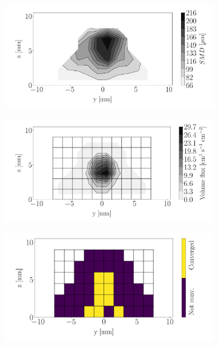 

\begin{figure}[h!]
\centering
\begin{subfigure}[b]{0.3\textwidth}
	\centering
   \includegraphics[scale=\scaleSLIJICF]{./part2_developments/figures_ch5_resolved_JICF/injectors_SLI/uG100_dx20_x10_SMD_map}
\end{subfigure}
   \hspace{0.17in}
\begin{subfigure}[b]{0.3\textwidth}
	\centering
   \includegraphics[scale=\scaleSLIJICF]{./part2_developments/figures_ch5_resolved_JICF/injectors_SLI/uG100_dx20_x10_volume_flux_map}
\end{subfigure}
   \hspace{0.17in}
\begin{subfigure}[b]{0.3\textwidth}
	\centering
   \includegraphics[scale=\scaleSLIJICF]{./part2_developments/figures_ch5_resolved_JICF/injectors_SLI/uG100_dx20_x10_convergence_map}
\end{subfigure}


\end{figure}
